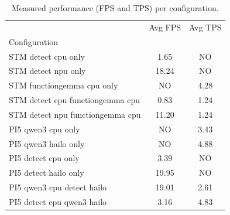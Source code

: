 \begin{table}[H]
\caption{Measured performance (FPS and TPS) per configuration.}
\label{tab:measured_performances}
\begin{tabular}{lcc}
\toprule
 & Avg FPS & Avg TPS \\
Configuration &  &  \\
\midrule
STM detect cpu only & 1.65 & NO \\
STM detect npu only & 18.24 & NO \\
STM functiongemma cpu only & NO & 4.28 \\
STM detect cpu functiongemma cpu & 0.83 & 1.24 \\
STM detect npu functiongemma cpu & 11.20 & 1.24 \\
PI5 qwen3 cpu only & NO & 3.43 \\
PI5 qwen3 hailo only & NO & 4.88 \\
PI5 detect cpu only & 3.39 & NO \\
PI5 detect hailo only & 19.95 & NO \\
PI5 qwen3 cpu detect hailo & 19.01 & 2.61 \\
PI5 detect cpu qwen3 hailo & 3.16 & 4.83 \\
\bottomrule
\end{tabular}
\end{table}
